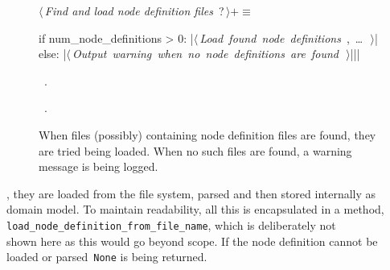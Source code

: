 \documentclass[%
    a4paper,    %
    justified,  %
    nobib,      %
    openany     %
]{tufte-book}
\makeatletter
\renewcommand{\label}[1]{\@tufte@label{##1}}%
\makeatother
\begin{document}
\begin{figure}[!h]
  \begin{flushleft} \small
\begin{minipage}{\linewidth}\label{scrap6}\raggedright\small
{} $\langle\,${\itshape Find and load node definition files}\nobreak\ {\footnotesize {?}}$\,\rangle+\equiv$
\vspace{-1ex}
\begin{pythoncode}
if num_node_definitions > 0:
    |\hbox{$\langle\,${\itshape Load found node definitions}\nobreak\ {\footnotesize {}, \ldots\ }$\,\rangle$}|
else:
    |\hbox{$\langle\,${\itshape Output warning when no node definitions are found}\nobreak\ {\footnotesize {}}$\,\rangle$}||\NWsep|
\end{pythoncode}
\vspace{1.5ex}
\footnotesize
\begin{list}{}{\setlength{\itemsep}{-\parsep}\setlength{\itemindent}{-\leftmargin}}
\item \NWtxtMacroDefBy\ .
\item \NWtxtMacroRefIn\ .

\item{}
\end{list}
\end{minipage}\vspace{4ex}
\end{flushleft}
\caption{When files (possibly) containing node definition files are found,
    they are tried being loaded. When no such files are found, a warning message
    is being logged.}
  \label{lst:nodes-controller-find-node-def-files-2}
\end{figure}

, they are loaded from the
file system, parsed and then stored internally as domain model. To maintain
readability, all this is encapsulated in a
method,\\
\texttt{load_node_definition_from_file_name}, which is
deliberately not\\
shown here as this would go beyond scope. If the node
definition cannot be loaded or parsed~\texttt{None} is being
returned.
\end{document}
